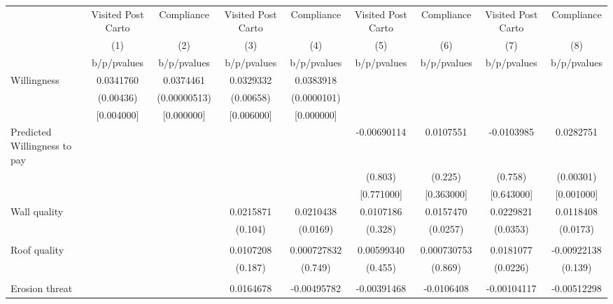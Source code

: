 {
\def\sym#1{\ifmmode^{#1}\else\(^{#1}\)\fi}
\begin{tabular}{l*{8}{c}}
\toprule
                &\multicolumn{1}{c}{Visited Post Carto}&\multicolumn{1}{c}{Compliance}&\multicolumn{1}{c}{Visited Post Carto}&\multicolumn{1}{c}{Compliance}&\multicolumn{1}{c}{Visited Post Carto}&\multicolumn{1}{c}{Compliance}&\multicolumn{1}{c}{Visited Post Carto}&\multicolumn{1}{c}{Compliance}\\
                &\multicolumn{1}{c}{(1)}&\multicolumn{1}{c}{(2)}&\multicolumn{1}{c}{(3)}&\multicolumn{1}{c}{(4)}&\multicolumn{1}{c}{(5)}&\multicolumn{1}{c}{(6)}&\multicolumn{1}{c}{(7)}&\multicolumn{1}{c}{(8)}\\
                &b/p/pvalues&b/p/pvalues&b/p/pvalues&b/p/pvalues&b/p/pvalues&b/p/pvalues&b/p/pvalues&b/p/pvalues\\
\midrule
Willingness     &0.0341760&0.0374461&0.0329332&0.0383918&         &         &         &         \\
                &(0.00436)&(0.00000513)&(0.00658)&(0.0000101)&         &         &         &         \\
                &[0.004000]&[0.000000]&[0.006000]&[0.000000]&         &         &         &         \\
Predicted Willingness to pay&         &         &         &         &-0.00690114&0.0107551&-0.0103985&0.0282751\\
                &         &         &         &         &  (0.803)&  (0.225)&  (0.758)&(0.00301)\\
                &         &         &         &         &[0.771000]&[0.363000]&[0.643000]&[0.001000]\\
Wall quality    &         &         &0.0215871&0.0210438&0.0107186&0.0157470&0.0229821&0.0118408\\
                &         &         &  (0.104)& (0.0169)&  (0.328)& (0.0257)& (0.0353)& (0.0173)\\
                &         &         &         &         &         &         &         &         \\
Roof quality    &         &         &0.0107208&0.000727832&0.00599340&0.000730753&0.0181077&-0.00922138\\
                &         &         &  (0.187)&  (0.749)&  (0.455)&  (0.869)& (0.0226)&  (0.139)\\
                &         &         &         &         &         &         &         &         \\
Erosion threat  &         &         &0.0164678&-0.00495782&-0.00391468&-0.0106408&-0.00104117&-0.00512298\\

\end{tabular}}
